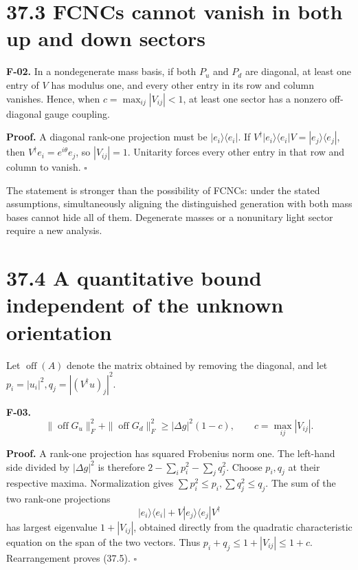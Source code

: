 \documentclass[
  11pt,
  oneside]{book}
\begin{document}
\section{37.3 FCNCs cannot vanish in both up and down sectors}

\label{f-02}{}

\textbf{F-02.} In a nondegenerate mass basis, if both \(P_u\) and
\(P_d\) are diagonal, at least one entry of \(V\) has modulus one, and
every other entry in its row and column vanishes. Hence, when
\(c=\max_{ij}|V_{ij}|<1\), at least one sector has a nonzero
off-diagonal gauge coupling.

\textbf{Proof.} A diagonal rank-one projection must be
\(|e_i\rangle\langle e_i|\). If
\(V^\dagger|e_i\rangle\langle e_i|V=|e_j\rangle\langle e_j|\), then
\(V^\dagger e_i=e^{i\theta}e_j\), so \(|V_{ij}|=1\). Unitarity forces
every other entry in that row and column to vanish. \(\square\)

The statement is stronger than the possibility of FCNCs: under the
stated assumptions, simultaneously aligning the distinguished generation
with both mass bases cannot hide all of them. Degenerate masses or a
nonunitary light sector require a new analysis.

\section{37.4 A quantitative bound independent of the unknown
orientation}

Let \(\operatorname{off}(A)\) denote the matrix obtained by removing the
diagonal, and let \(p_i=|u_i|^2,q_j=|(V^\dagger u)_j|^2\).

\label{f-03}{}

\textbf{F-03.} \[
\|\operatorname{off}G_u\|_F^2+
\|\operatorname{off}G_d\|_F^2
\ge |\Delta g|^2(1-c),\qquad c=\max_{ij}|V_{ij}|.
\tag{37.5}
\]

\textbf{Proof.} A rank-one projection has squared Frobenius norm one.
The left-hand side divided by \(|\Delta g|^2\) is therefore
\(2-\sum_i p_i^2-\sum_jq_j^2\). Choose \(p_i,q_j\) at their respective
maxima. Normalization gives \(\sum p_i^2\le p_i,\sum q_j^2\le q_j\). The
sum of the two rank-one projections \[
|e_i\rangle\langle e_i|+
V|e_j\rangle\langle e_j|V^\dagger
\] has largest eigenvalue \(1+|V_{ij}|\), obtained directly from the
quadratic characteristic equation on the span of the two vectors. Thus
\(p_i+q_j\le1+|V_{ij}|\le1+c\). Rearrangement proves (37.5). \(\square\)
\end{document}
